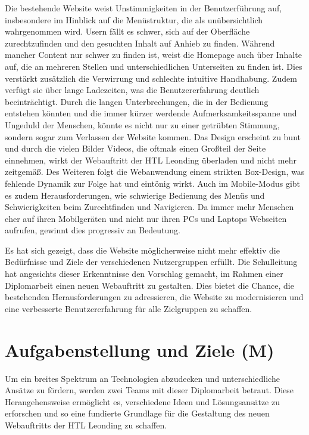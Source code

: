 Die bestehende Website weist Unstimmigkeiten in der Benutzerführung auf, 
insbesondere im Hinblick auf die Menüstruktur, die als unübersichtlich wahrgenommen wird. 
Usern fällt es schwer, sich auf der Oberfläche zurechtzufinden und den gesuchten Inhalt auf Anhieb zu finden. 
Während mancher Content nur schwer zu finden ist, weist die Homepage auch über Inhalte auf, 
die an mehreren Stellen und unterschiedlichen Unterseiten zu finden ist. Dies verstärkt zusätzlich 
die Verwirrung und schlechte intuitive Handhabung. Zudem verfügt sie über lange Ladezeiten, was die 
Benutzererfahrung deutlich beeinträchtigt. Durch die langen Unterbrechungen, 
die in der Bedienung entstehen könnten und die immer kürzer werdende Aufmerksamkeitsspanne und Ungeduld der Menschen, 
könnte es nicht nur zu einer getrübten Stimmung, sondern sogar zum Verlassen der Website kommen. Das Design erscheint 
zu bunt und durch die vielen Bilder Videos, die oftmals einen Großteil der Seite einnehmen, 
wirkt der Webauftritt der HTL Leonding überladen und nicht mehr zeitgemäß. Des Weiteren folgt die Webanwendung einem strikten
Box-Design, was fehlende Dynamik zur Folge hat und eintönig wirkt. Auch im Mobile-Modus gibt es zudem Herausforderungen,
wie schwierige Bedienung des Menüs und Schwierigkeiten beim Zurechtfinden und Navigieren. Da immer mehr Menschen eher auf 
ihren Mobilgeräten und nicht nur ihren PCs und Laptops Webseiten aufrufen, gewinnt dies progressiv an Bedeutung.

Es hat sich gezeigt, dass die Website möglicherweise nicht mehr effektiv die Bedürfnisse und 
Ziele der verschiedenen Nutzergruppen erfüllt. Die Schulleitung hat angesichts dieser Erkenntnisse den Vorschlag gemacht, 
im Rahmen einer Diplomarbeit einen neuen Webauftritt zu gestalten. Dies bietet die Chance, die bestehenden 
Herausforderungen zu adressieren, die Website zu modernisieren und eine verbesserte Benutzererfahrung für alle Zielgruppen zu schaffen.


\section{Aufgabenstellung und Ziele (M)}

Um ein breites Spektrum an Technologien abzudecken und unterschiedliche Ansätze zu fördern, werden zwei Teams mit dieser Diplomarbeit betraut. 
Diese Herangehensweise ermöglicht es, verschiedene Ideen und Lösungsansätze zu erforschen und so eine fundierte Grundlage für die Gestaltung 
des neuen Webauftritts der HTL Leonding zu schaffen.

